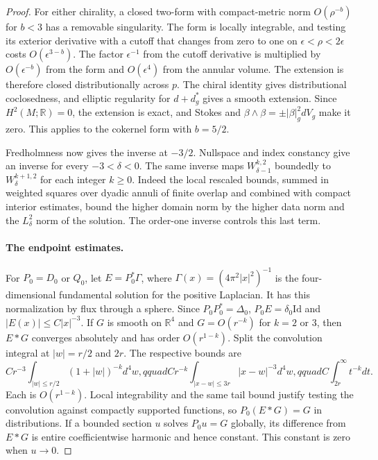 \documentclass[11pt,letterpaper]{article}
\numberwithin{equation}{section}
\begin{document}
\begin{proof}
For either chirality, a closed two-form with compact-metric norm
\(O(\rho^{-b})\) for \(b<3\) has a removable singularity. The form
is locally integrable, and testing its exterior derivative with a cutoff
that changes from zero to one on \(\epsilon<\rho<2\epsilon\) costs
\(O(\epsilon^{3-b})\). The factor \(\epsilon^{-1}\) from the cutoff
derivative is multiplied by \(O(\epsilon^{-b})\) from the form and
\(O(\epsilon^4)\) from the annular volume. The extension is therefore
closed distributionally across \(p\). The chiral identity gives distributional coclosedness, and
elliptic regularity for \(d+d_g^*\) gives a smooth extension. Since
\(H^2(M;\mathbb R)=0\), the extension is exact, and Stokes and
\(\beta\wedge\beta=\pm|\beta|_g^2dV_g\) make it zero. This applies to
the cokernel form with \(b=5/2\).

Fredholmness now gives the inverse at \(-3/2\). Nullspace and index
constancy give an inverse for every \(-3<\delta<0\). The same inverse
maps \(W^{k,2}_{\delta-1}\) boundedly to \(W^{k+1,2}_\delta\) for
each integer \(k\ge0\). Indeed the local rescaled bounds, summed in
weighted squares over dyadic annuli of finite overlap and combined
with compact interior estimates, bound the higher domain norm by the
higher data norm and the \(L^2_\delta\) norm of the solution. The
order-one inverse controls this last term.

\paragraph{The endpoint estimates.}
For \(P_0=D_0\) or \(Q_0\), let
\(E=P_0^*\Gamma\), where \(\Gamma(x)=(4\pi^2|x|^2)^{-1}\)
is the four-dimensional fundamental solution for the positive
Laplacian. It has this normalization by flux through a sphere.
Since \(P_0P_0^*=\Delta_0\), \(P_0E=\delta_0\mathrm{Id}\)
and \(|E(x)|\le C|x|^{-3}\).
If \(G\) is smooth on \(\mathbb R^4\) and \(G=O(r^{-k})\) for
\(k=2\) or \(3\), then \(E*G\) converges absolutely and has
order \(O(r^{1-k})\). Split the convolution integral at
\(|w|=r/2\) and \(2r\). The respective bounds are
\[
 Cr^{-3}\int_{|w|\le r/2}(1+|w|)^{-k}d^4w,qquad
 Cr^{-k}\int_{|x-w|\le3r}|x-w|^{-3}d^4w,qquad
 C\int_{2r}^\infty t^{-k}dt.
\]
Each is \(O(r^{1-k})\). Local integrability and the same tail bound
justify testing the convolution against compactly supported functions,
so \(P_0(E*G)=G\) in distributions. If a bounded section \(u\) solves
\(P_0u=G\) globally, its difference from \(E*G\) is entire
coefficientwise harmonic and hence constant. This constant is zero
when \(u\to0\).


\end{proof}
\end{document}
